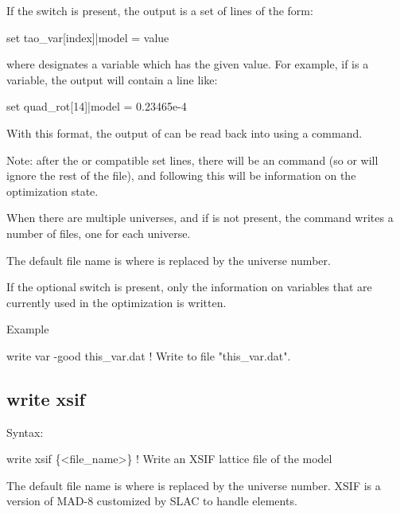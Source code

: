 {{{{{{{{{{{If the  switch is present, the output is a set of lines of the form:
\begin{example}
  set tao_var[index]|model = value
\end{example}
where  designates a \tao variable which has the given  value. For
example, if  is a \tao variable, the output
will contain a line like:
\begin{example}
  set quad_rot[14]|model = 0.23465e-4
\end{example}
With this format, the output of  can be read back into \tao using a 
command.

Note: after the \bmad or \tao compatible set lines, there will be an  command (so \bmad
or \tao will ignore the rest of the file), and following this will be information on the
optimization state.

When there are multiple universes, and if  is not present, the 
command writes a number of files, one for each universe.

The default file name is  where \vn{\#} is replaced by the universe number. 

If the optional  switch is present, only the information on variables that are
currently used in the optimization is written.

Example
\begin{example}
  write var -good this_var.dat  ! Write to file "this_var.dat".
\end{example}


\subsection{write xsif}
\label{s:write.xsif}

Syntax:
\begin{example}
    write xsif \{<file_name>\}  ! Write an XSIF lattice file of the model
\end{example}

The default file name is  where \vn{\#} is replaced by the universe number. XSIF is
a version of MAD-8 customized by SLAC to handle  elements.


}}}}}}}}}}}
